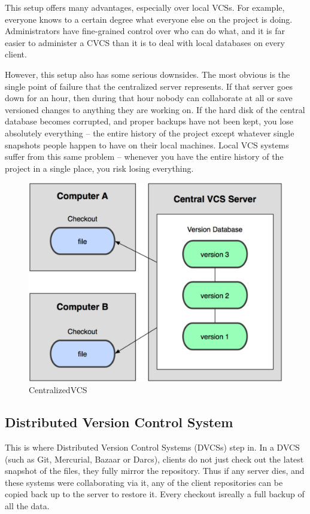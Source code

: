 \documentclass[11pt,a4paper]{article}
\begin{document}
This setup offers many advantages, especially over local VCSs. For example, everyone knows to a certain degree what everyone else on the project is doing. Administrators have fine-grained control over who can do what, and it is far easier to administer a CVCS than it is to deal with local databases on every client.

However, this setup also has some serious downsides. The most obvious is the single point of failure that the centralized server represents. If that server goes down for an hour, then during that hour nobody can collaborate at all or save versioned changes to anything they are working on. If the hard disk of the central database becomes corrupted, and proper backups have not been kept, you lose absolutely everything – the entire history of the project except whatever single snapshots people happen to have on their local machines. Local VCS systems suffer from this same problem – whenever you have the entire history of the project in a single place, you risk losing everything.

\begin{figure}[H]
\begin{center}
\includegraphics[scale=0.4]{CentralizedVCS.png}
\caption{CentralizedVCS}
\label{CentralizedVCS}\end{center}
\end{figure}

\subsection*{Distributed Version Control System}
This is where Distributed Version Control Systems (DVCSs) step in. In a DVCS (such as Git, Mercurial, Bazaar or Darcs), clients do not just check out the latest snapshot of the files, they fully mirror the repository. Thus if any server dies, and these systems were collaborating via it, any of the client repositories can be copied back up to the server to restore it. Every checkout isreally a full backup of all the data.
\end{document}
